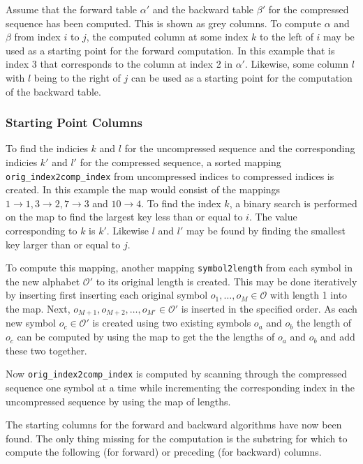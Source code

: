 Assume that the forward table $\alpha'$ and the backward table $\beta'$ for the
compressed sequence has been computed. This is shown as grey columns. To
compute $\alpha$ and $\beta$ from index $i$ to $j$, the computed column at some
index $k$ to the left of $i$ may be used as a starting point for the forward
computation. In this example that is index 3 that corresponds to the column at
index 2 in $\alpha'$. Likewise, some column $l$ with $l$ being to the right of
$j$ can be used as a starting point for the computation of the backward table.

\subsubsection{Starting Point Columns}

To find the indicies $k$ and $l$ for the uncompressed sequence and the
corresponding indicies $k'$ and $l'$ for the compressed sequence, a sorted
mapping \texttt{orig\_index2comp\_index} from uncompressed indices to
compressed indices is created. In this example the map would consist of the
mappings $1 \rightarrow 1, 3 \rightarrow 2, 7 \rightarrow 3$ and
$10 \rightarrow 4$. To find the index $k$, a binary search is performed on the
map to find the largest key less than or equal to $i$. The value corresponding
to $k$ is $k'$. Likewise $l$ and $l'$ may be found by finding the smallest key
larger than or equal to $j$.

To compute this mapping, another mapping \texttt{symbol2length} from each
symbol in the new alphabet $\mathcal{O'}$ to its original length is
created. This may be done iteratively by inserting first inserting each
original symbol $o_1, \dots, o_M \in \mathcal{O}$ with length 1 into the
map. Next, $o_{M+1}, o_{M+2}, \dots, o_{M'} \in \mathcal{O'}$ is inserted in
the specified order. As each new symbol $o_c \in \mathcal{O'}$ is created using
two existing symbols $o_a$ and $o_b$ the length of $o_c$ can be computed by
using the map to get the the lengths of $o_a$ and $o_b$ and add these two
together.

Now \texttt{orig\_index2comp\_index} is computed by scanning through the
compressed sequence one symbol at a time while incrementing the corresponding
index in the uncompressed sequence by using the map of lengths.

The starting columns for the forward and backward algorithms have now been
found. The only thing missing for the computation is the substring for which
to compute the following (for forward) or preceding (for backward) columns.


